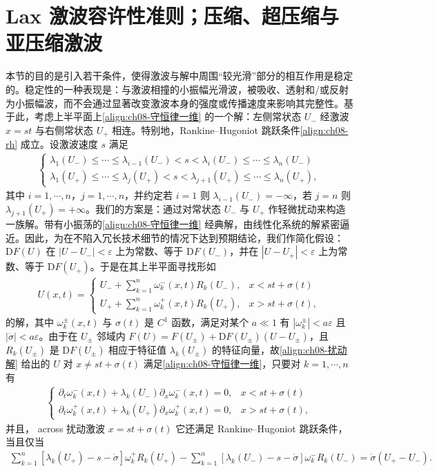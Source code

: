 \documentclass[../../main.tex]{subfiles}
\begin{document}
\section{Lax 激波容许性准则；压缩、超压缩与亚压缩激波}\label{section:ch08-lax容许性准则}

本节的目的是引入若干条件，使得激波与解中周围“较光滑”部分的相互作用是稳定的。稳定性的一种表现是：与激波相撞的小振幅光滑波，被吸收、透射和/或反射为小振幅波，而不会通过显著改变激波本身的强度或传播速度来影响其完整性。基于此，考虑上半平面上\eqref{align:ch08-守恒律一维} 的一个解：左侧常状态 $U_-$ 经激波 $x=st$ 与右侧常状态 $U_+$ 相连。特别地，Rankine--Hugoniot 跳跃条件\eqref{align:ch08-rh} 成立。设激波速度 $s$ 满足
\begin{align}
\begin{cases}
\lambda_1(U_-)\leqslant\cdots\leqslant\lambda_{i-1}(U_-)<s<\lambda_i(U_-)\leqslant\cdots\leqslant\lambda_n(U_-)\\
\lambda_1(U_+)\leqslant\cdots\leqslant\lambda_j(U_+)<s<\lambda_{j+1}(U_+)\leqslant\cdots\leqslant\lambda_n(U_+),
\end{cases}
\label{align:ch08-lax谱条件}
\end{align}
其中 $i=1,\cdots,n$，$j=1,\cdots,n$，并约定若 $i=1$ 则 $\lambda_{i-1}(U_-)=-\infty$，若 $j=n$ 则 $\lambda_{j+1}(U_+)=+\infty$。我们的方案是：通过对常状态 $U_-$ 与 $U_+$ 作轻微扰动来构造一族解。带有小振荡的\eqref{align:ch08-守恒律一维} 经典解，由线性化系统的解紧密逼近。因此，为在不陷入冗长技术细节的情况下达到预期结论，我们作简化假设：$\mathrm{D}F(U)$ 在 $|U-U_-|<\varepsilon$ 上为常数、等于 $\mathrm{D}F(U_-)$，并在 $|U-U_+|<\varepsilon$ 上为常数、等于 $\mathrm{D}F(U_+)$。于是在其上半平面寻找形如
\begin{align}
U(x,t)=
\begin{cases}
U_-+\sum_{k=1}^{n}\omega_k^-(x,t)R_k(U_-),&x<st+\sigma(t)\\
U_++\sum_{k=1}^{n}\omega_k^+(x,t)R_k(U_+),&x>st+\sigma(t),
\end{cases}
\label{align:ch08-扰动解}
\end{align}
的解，其中 $\omega_k^\pm(x,t)$ 与 $\sigma(t)$ 是 $C^1$ 函数，满足对某个 $a\ll1$ 有 $|\omega_k^\pm|<a\varepsilon$ 且 $|\dot\sigma|<a\varepsilon$。由于在 $U_\pm$ 邻域内 $F(U)=F(U_\pm)+\mathrm{D}F(U_\pm)(U-U_\pm)$，且 $R_k(U_\pm)$ 是 $\mathrm{D}F(U_\pm)$ 相应于特征值 $\lambda_k(U_\pm)$ 的特征向量，故\eqref{align:ch08-扰动解} 给出的 $U$ 对 $x\neq st+\sigma(t)$ 满足\eqref{align:ch08-守恒律一维}，只要对 $k=1,\cdots,n$ 有
\begin{align}
\begin{cases}
\partial_t\omega_k^-(x,t)+\lambda_k(U_-)\partial_x\omega_k^-(x,t)=0,&x<st+\sigma(t)\\
\partial_t\omega_k^+(x,t)+\lambda_k(U_+)\partial_x\omega_k^+(x,t)=0,&x>st+\sigma(t),
\end{cases}
\label{align:ch08-扰动方程}
\end{align}
并且， across 扰动激波 $x=st+\sigma(t)$ 它还满足 Rankine--Hugoniot 跳跃条件，当且仅当
\begin{align}
\sum_{k=1}^{n}[\lambda_k(U_+)-s-\dot\sigma]\omega_k^+R_k(U_+)
-\sum_{k=1}^{n}[\lambda_k(U_-)-s-\dot\sigma]\omega_k^-R_k(U_-)
=\dot\sigma(U_+-U_-).
\label{align:ch08-扰动rh}
\end{align}
\end{document}
